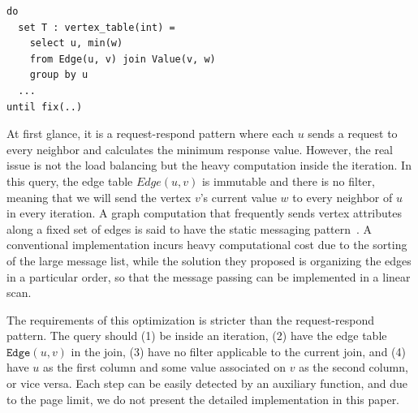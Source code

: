 \documentclass{sokendai_thesis} %
\begin{document}
\begin{lstlisting}[language=sql-graph]
do
  set T : vertex_table(int) =
    select u, min(w)
    from Edge(u, v) join Value(v, w)
    group by u
  ...
until fix(..)
\end{lstlisting}

At first glance, it is a request-respond pattern where each $u$ sends a request to every neighbor and calculates the minimum response value.
However, the real issue is not the load balancing but the heavy computation inside the iteration.
In this query, the edge table $Edge(u, v)$ is immutable and there is no filter, meaning that we will send the vertex $v$'s current value $w$ to every neighbor of $u$ in every iteration.
A graph computation that frequently sends vertex attributes along a fixed set of edges is said to have the static messaging pattern~\cite{zhang2019composing}.
A conventional implementation incurs heavy computational cost due to the sorting of the large message list, while the solution they proposed is organizing the edges in a particular order, so that the message passing can be implemented in a linear scan.

The requirements of this optimization is stricter than the request-respond pattern.
The query should (1) be inside an iteration, (2) have the edge table $\texttt{Edge}(u,v)$ in the join, (3) have no filter applicable to the current join, and (4) have $u$ as the first column and some value associated on $v$ as the second column, or vice versa.
Each step can be easily detected by an auxiliary function, and due to the page limit, we do not present the detailed implementation in this paper.
\end{document}
